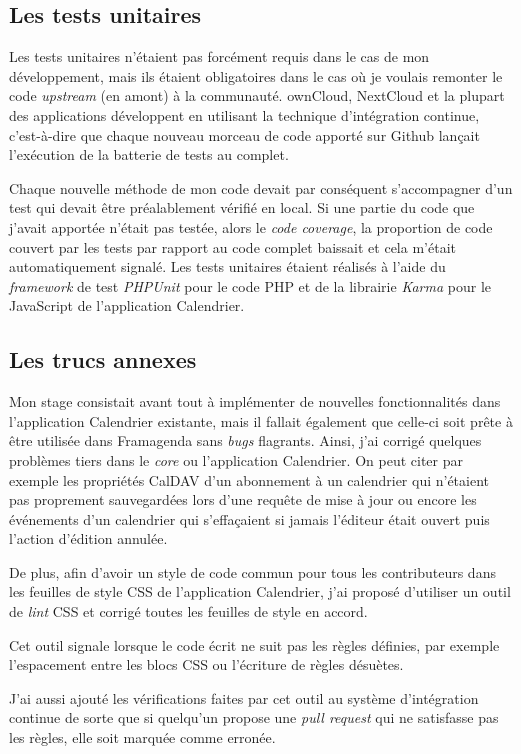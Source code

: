 \documentclass[10pt,a4paper, twoside]{report}
\begin{document}
	\subsection{Les tests unitaires}
	Les tests unitaires n'étaient pas forcément requis dans le cas de mon développement, mais ils étaient obligatoires dans le cas où je voulais remonter le code \textit{upstream} (en amont) à la communauté. ownCloud, NextCloud et la plupart des applications développent en utilisant la technique d'intégration continue, c'est-à-dire que chaque nouveau morceau de code apporté sur Github lançait l'exécution de la batterie de tests au complet. 
	
	Chaque nouvelle méthode de mon code devait par conséquent s'accompagner d'un test qui devait être préalablement vérifié en local. Si une partie du code que j'avait apportée n'était pas testée, alors le \textit{code coverage}, la proportion de code couvert par les tests par rapport au code complet baissait et cela m'était automatiquement signalé. Les tests unitaires étaient réalisés à l'aide du \textit{framework} de test \textit{PHPUnit} pour le code PHP et de la librairie \textit{Karma} pour le JavaScript de l'application Calendrier.
	
	\subsection{Les trucs annexes}
	Mon stage consistait avant tout à implémenter de nouvelles fonctionnalités dans l'application Calendrier existante, mais il fallait également que celle-ci soit prête à être utilisée dans Framagenda sans \textit{bugs} flagrants. Ainsi, j'ai corrigé quelques problèmes tiers dans le \textit{core} ou l'application Calendrier.
	On peut citer par exemple les propriétés CalDAV d'un abonnement à un calendrier qui n'étaient pas proprement sauvegardées lors d'une requête de mise à jour ou encore les événements d'un calendrier qui s'effaçaient si jamais l'éditeur était ouvert puis l'action d'édition annulée. 
	
	De plus, afin d'avoir un style de code commun pour tous les contributeurs dans les feuilles de style CSS de l'application Calendrier, j'ai proposé d'utiliser un outil de \textit{lint} CSS et corrigé toutes les feuilles de style en accord. 
	
	Cet outil signale lorsque le code écrit ne suit pas les règles définies, par exemple l'espacement entre les blocs CSS ou l'écriture de règles désuètes.
	
	J'ai aussi ajouté les vérifications faites par cet outil au système d'intégration continue de sorte que si quelqu'un propose une \textit{pull request} qui ne satisfasse pas les règles, elle soit marquée comme erronée.
	
\end{document}
